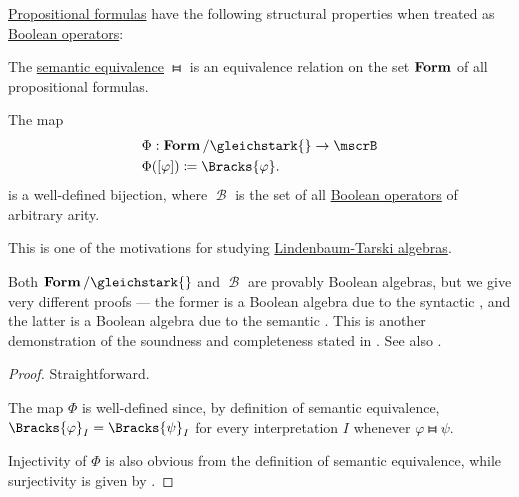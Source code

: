 \begin{proposition}\label{thm:lindenmaum_tarski_algebra_of_full_propositional_logic}
  \hyperref[def:propositional_syntax/formula]{Propositional formulas} have the following structural properties when treated as \hyperref[def:boolean_operator]{Boolean operators}:

  \begin{thmenum}
     The \hyperref[def:propositional_semantics/equivalence]{semantic equivalence} \( \gleichstark \) is an equivalence relation on the set \( \operatorname{\mathbf{Form}} \) of all propositional formulas.

     The map
    \begin{equation*}
      \begin{aligned}
        &\Phi: \boldop{Form} / {}\gleichstark{} \to \mscrB \\
        &\Phi([\varphi]) \coloneqq \Bracks{\varphi}.
      \end{aligned}
    \end{equation*}
    is a well-defined bijection, where \( \mscrB \) is the set of all \hyperref[def:boolean_operator]{Boolean operators} of arbitrary arity.
  \end{thmenum}
\end{proposition}
\begin{comments}
  \item This is one of the motivations for studying \hyperref[def:lindenbaum_tarski_algebra]{Lindenbaum-Tarski algebras}.
  \item Both \( \boldop{Form} / {}\gleichstark{} \) and \( \mscrB \) are provably Boolean algebras, but we give very different proofs --- the former is a Boolean algebra due to the syntactic , and the latter is a Boolean algebra due to the semantic . This is another demonstration of the soundness and completeness stated in . See also .
\end{comments}
\begin{proof}
   Straightforward.

   The map \( \Phi \) is well-defined since, by definition of semantic equivalence, \( \Bracks{\varphi}_I = \Bracks{\psi}_I \) for every interpretation \( I \) whenever \( \varphi \gleichstark \psi \).

  Injectivity of \( \Phi \) is also obvious from the definition of semantic equivalence, while surjectivity is given by .
\end{proof}
